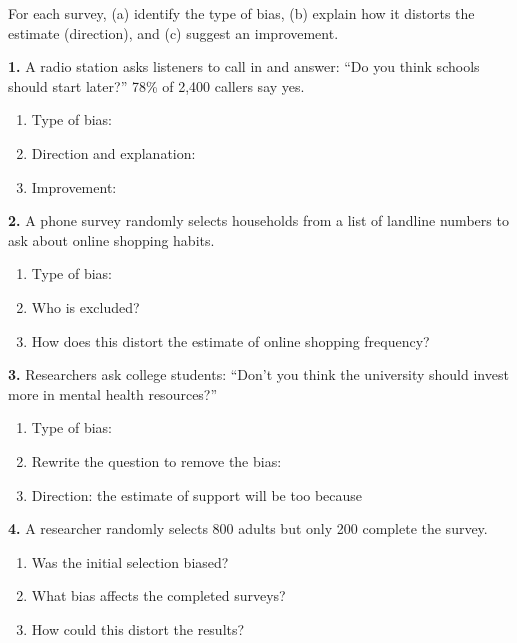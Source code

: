 \documentclass[10pt]{article}
\begin{document}
\namedateperiod

\vspace{0.1in}

\begin{practicebox}
\small
For each survey, (a) identify the type of bias, (b) explain how it distorts the
estimate (direction), and (c) suggest an improvement.

\vspace{8pt}
\textbf{1.} A radio station asks listeners to call in and answer: ``Do you think
schools should start later?'' 78\% of 2{,}400 callers say yes.

\begin{enumerate}[label=(\alph*), leftmargin=2em, itemsep=7pt]
  \item Type of bias: \blank{8cm}
  \item Direction and explanation: \writeline\\[1pt]\writeline
  \item Improvement: \writeline
\end{enumerate}

\vspace{8pt}
\textbf{2.} A phone survey randomly selects households from a list of landline
numbers to ask about online shopping habits.

\begin{enumerate}[label=(\alph*), leftmargin=2em, itemsep=7pt]
  \item Type of bias: \blank{8cm}
  \item Who is excluded? \writeline
  \item How does this distort the estimate of online shopping frequency?
        \writeline\\[1pt]\writeline
\end{enumerate}

\vspace{8pt}
\textbf{3.} Researchers ask college students: ``Don't you think the university
should invest more in mental health resources?''

\begin{enumerate}[label=(\alph*), leftmargin=2em, itemsep=7pt]
  \item Type of bias: \blank{8cm}
  \item Rewrite the question to remove the bias: \writeline
  \item Direction: the estimate of support will be too \blank{3cm} because
        \blank{7cm}
\end{enumerate}

\vspace{8pt}
\textbf{4.} A researcher randomly selects 800 adults but only 200 complete the survey.

\begin{enumerate}[label=(\alph*), leftmargin=2em, itemsep=7pt]
  \item Was the initial selection biased? \blank{3cm}
  \item What bias affects the completed surveys? \blank{6cm}
  \item How could this distort the results? \writeline\\[1pt]\writeline
\end{enumerate}
\end{practicebox}
\end{document}
